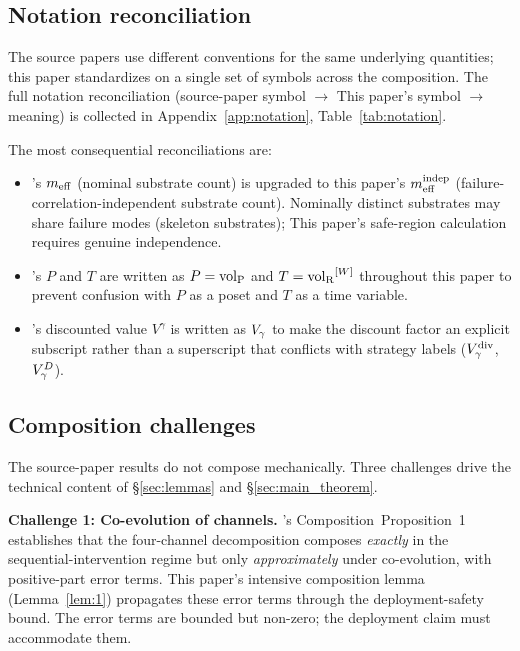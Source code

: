 \subsection{Notation reconciliation}
\label{sec:notation}

The source papers use different conventions for the same underlying
quantities; this paper standardizes on a single set of symbols
across the composition.  The full notation reconciliation
(source-paper symbol $\to$ This paper's symbol $\to$ meaning) is
collected in Appendix~\ref{app:notation}, Table~\ref{tab:notation}.

The most consequential reconciliations are:
\begin{itemize}
\item \citep[Phase Redundancy]{lasser2026phase}'s $m_{\mathrm{eff}}$ (nominal
  substrate count) is upgraded to this paper's $m_{\mathrm{eff}}^{\mathrm{indep}}$
  (failure-correlation-independent substrate count).  Nominally
  distinct substrates may share failure modes (skeleton substrates);
  This paper's safe-region calculation requires genuine independence.
\item \citep[Microfoundation]{lasser2026micro}'s $P$ and $T$ are
  written as $P = {\operatorname{vol}_{\mathrm{P}}}$ and $T = {\operatorname{vol}_{\mathrm{R}}}^{[W]}$ throughout
  this paper to prevent confusion with $P$ as a poset and $T$ as a
  time variable.
\item \citep[Horizon Aware]{lasser2026horizon}'s discounted value
  $V^\gamma$ is written as $V_{\gamma}$ to make the discount factor an
  explicit subscript rather than a superscript that conflicts with
  strategy labels ($V_{\gamma}^{\mathrm{div}}$, $V_{\gamma}^D$).
\end{itemize}

\subsection{Composition challenges}
\label{sec:composition_challenges}

The source-paper results do not compose mechanically. Three challenges drive
the technical content of \S\ref{sec:lemmas} and \S\ref{sec:main_theorem}.

\textbf{Challenge 1: Co-evolution of channels.}  \citep[Microfoundation]{lasser2026micro}'s
Composition~Proposition~1 establishes that the four-channel
decomposition composes \emph{exactly} in the sequential-intervention
regime but only \emph{approximately} under co-evolution, with
positive-part error terms. This paper's intensive composition lemma
(Lemma~\ref{lem:1}) propagates these error terms through the
deployment-safety bound. The error terms are bounded but non-zero;
the deployment claim must accommodate them.

